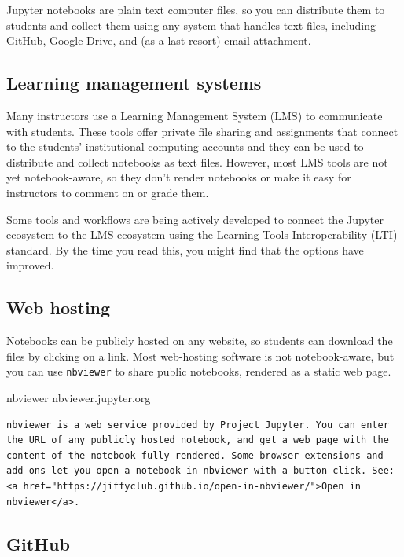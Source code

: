 \documentclass[]{book}
\begin{document}
Jupyter notebooks are plain text computer files, so you can distribute
them to students and collect them using any system that handles text
files, including GitHub, Google Drive, and (as a last resort) email
attachment.

\subsection{Learning management
systems}\label{learning-management-systems}

Many instructors use a Learning Management System (LMS) to communicate
with students. These tools offer private file sharing and assignments
that connect to the students' institutional computing accounts and they
can be used to distribute and collect notebooks as text files. However,
most LMS tools are not yet notebook-aware, so they don't render
notebooks or make it easy for instructors to comment on or grade them.

Some tools and workflows are being actively developed to connect the
Jupyter ecosystem to the LMS ecosystem using the
\href{https://open.edx.org/learning-tools-interoperability}{Learning
Tools Interoperability (LTI)} standard. By the time you read this, you
might find that the options have improved.

\subsection{Web hosting}\label{web-hosting}

Notebooks can be publicly hosted on any website, so students can
download the files by clicking on a link. Most web-hosting software is
not notebook-aware, but you can use \texttt{nbviewer} to share public
notebooks, rendered as a static web page.

nbviewer nbviewer.jupyter.org

\begin{verbatim}
nbviewer is a web service provided by Project Jupyter. You can enter the URL of any publicly hosted notebook, and get a web page with the content of the notebook fully rendered. Some browser extensions and add-ons let you open a notebook in nbviewer with a button click. See: <a href="https://jiffyclub.github.io/open-in-nbviewer/">Open in nbviewer</a>.
\end{verbatim}

\subsection{GitHub}\label{github}
\end{document}
